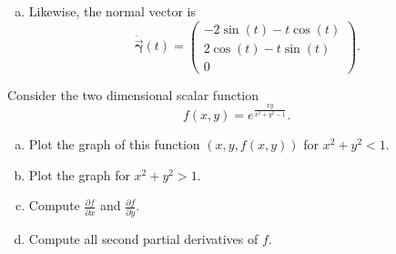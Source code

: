 \documentclass[12pt]{article} %
\newcommand{\normalgamma}{\boldsymbol{\ddot{\vec{\gamma}}}}
\begin{document}
\begin{solution}
\begin{enumerate}[(a)]
    \item Likewise, the normal vector is
    \[
    \normalgamma(t) = \begin{pmatrix} -2\sin(t)-t\cos(t) \\ 2 \cos(t)-t\sin(t) \\ 0 \end{pmatrix}.
    \]
\end{enumerate}
\end{solution}

\newpage
\begin{problem} Consider the two dimensional scalar function 
\[
f(x,y)=e^{\frac{xy}{x^2+y^2-1}}.
\]  
    \begin{enumerate}[(a)]
        \item Plot the graph of this function $(x,y,f(x,y))$ for $x^2+y^2<1$.  
        \item Plot the graph for $x^2+y^2>1$.  
        \item Compute $\frac{\partial f}{\partial x}$ and $\frac{\partial f}{\partial y}$.
        \item Compute all second partial derivatives of $f$.
    \end{enumerate}
\end{problem}
\end{document}

